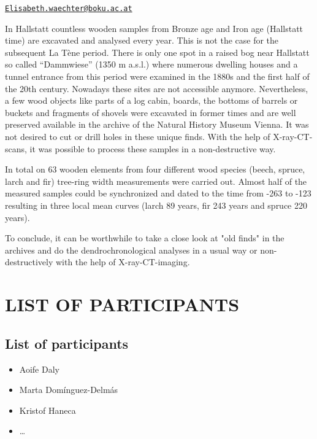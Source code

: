 \documentclass[
]{book}
\providecommand{\tightlist}{%
  \setlength{\itemsep}{0pt}\setlength{\parskip}{0pt}}
\begin{document}
\href{mailto:Elisabeth.waechter@boku.ac.at}{\nolinkurl{Elisabeth.waechter@boku.ac.at}}

In Hallstatt countless wooden samples from Bronze age and Iron age (Hallstatt time) are excavated and analysed every year. This is not the case for the subsequent La Tène period. There is only one spot in a raised bog near Hallstatt so called ``Dammwiese'' (1350 m a.s.l.) where numerous dwelling houses and a tunnel entrance from this period were examined in the 1880s and the first half of the 20th century. Nowadays these sites are not accessible anymore. Nevertheless, a few wood objects like parts of a log cabin, boards, the bottoms of barrels or buckets and fragments of shovels were excavated in former times and are well preserved available in the archive of the Natural History Museum Vienna. It was not desired to cut or drill holes in these unique finds. With the help of X-ray-CT-scans, it was possible to process these samples in a non-destructive way.

In total on 63 wooden elements from four different wood species (beech, spruce, larch and fir) tree-ring width measurements were carried out. Almost half of the measured samples could be synchronized and dated to the time from -263 to -123 resulting in three local mean curves (larch 89 years, fir 243 years and spruce 220 years).

To conclude, it can be worthwhile to take a close look at "old finds" in the archives and do the dendrochronological analyses in a usual way or non-destructively with the help of X-ray-CT-imaging.

\hypertarget{part-list-of-participants}{%
\part*{LIST OF PARTICIPANTS}\label{part-list-of-participants}}

\hypertarget{list-of-participants}{%
\chapter*{List of participants}\label{list-of-participants}}

\begin{itemize}
\tightlist
\item
  Aoife Daly
\item
  Marta Domínguez-Delmás
\item
  Kristof Haneca
\item
  \ldots{}
\end{itemize}
\end{document}
